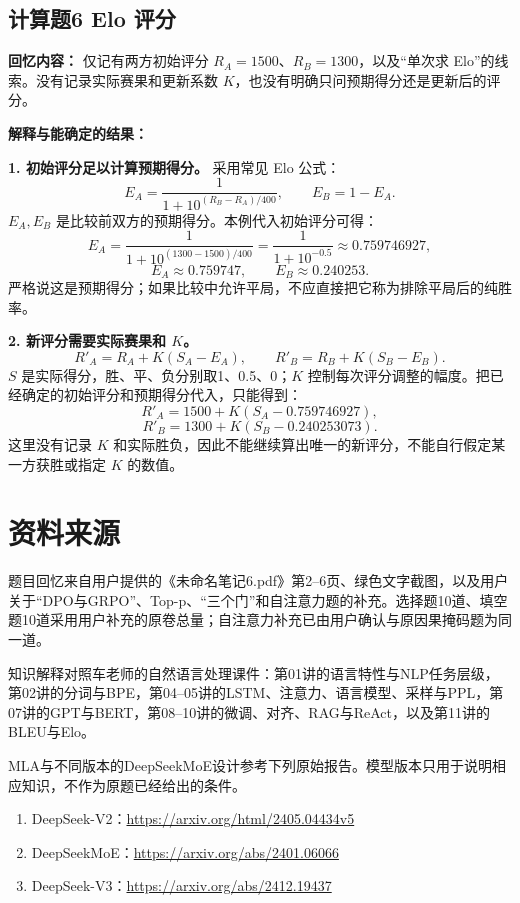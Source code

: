 \documentclass[UTF8,a4paper,zihao=-4,fontset=windows]{ctexart}
\newcommand{\recalled}[1]{\Needspace{8\baselineskip}\subsection*{#1}}
\begin{document}
\clearpage
\recalled{计算题6 Elo 评分}

\textbf{回忆内容：}
仅记有两方初始评分 $R_A=1500$、$R_B=1300$，以及“单次求 Elo”的线索。没有记录实际赛果和更新系数 $K$，也没有明确只问预期得分还是更新后的评分。

\textbf{解释与能确定的结果：}

\textbf{1. 初始评分足以计算预期得分。}
采用常见 Elo 公式：
\[
E_A=\frac1{1+10^{(R_B-R_A)/400}},\qquad E_B=1-E_A.
\]
$E_A,E_B$ 是比较前双方的预期得分。本例代入初始评分可得：
\[
E_A=\frac1{1+10^{(1300-1500)/400}}
=\frac1{1+10^{-0.5}}\approx0.759746927,
\]
\[
\boxed{E_A\approx0.759747,\qquad E_B\approx0.240253.}
\]
严格说这是预期得分；如果比较中允许平局，不应直接把它称为排除平局后的纯胜率。

\textbf{2. 新评分需要实际赛果和 $K$。}
\[
R'_A=R_A+K(S_A-E_A),\qquad
R'_B=R_B+K(S_B-E_B).
\]
$S$ 是实际得分，胜、平、负分别取1、0.5、0；$K$ 控制每次评分调整的幅度。把已经确定的初始评分和预期得分代入，只能得到：
\[
\boxed{R'_A=1500+K(S_A-0.759746927),}
\]
\[
\boxed{R'_B=1300+K(S_B-0.240253073).}
\]
这里没有记录 $K$ 和实际胜负，因此不能继续算出唯一的新评分，不能自行假定某一方获胜或指定 $K$ 的数值。


\section{资料来源}

题目回忆来自用户提供的《未命名笔记6.pdf》第2--6页、绿色文字截图，以及用户关于“DPO与GRPO”、Top-p、“三个门”和自注意力题的补充。选择题10道、填空题10道采用用户补充的原卷总量；自注意力补充已由用户确认与原因果掩码题为同一道。

知识解释对照车老师的自然语言处理课件：第01讲的语言特性与NLP任务层级，第02讲的分词与BPE，第04--05讲的LSTM、注意力、语言模型、采样与PPL，第07讲的GPT与BERT，第08--10讲的微调、对齐、RAG与ReAct，以及第11讲的BLEU与Elo。

MLA与不同版本的DeepSeekMoE设计参考下列原始报告。模型版本只用于说明相应知识，不作为原题已经给出的条件。
\begin{enumerate}
\item DeepSeek-V2：\url{https://arxiv.org/html/2405.04434v5}
\item DeepSeekMoE：\url{https://arxiv.org/abs/2401.06066}
\item DeepSeek-V3：\url{https://arxiv.org/abs/2412.19437}
\end{enumerate}
\end{document}
